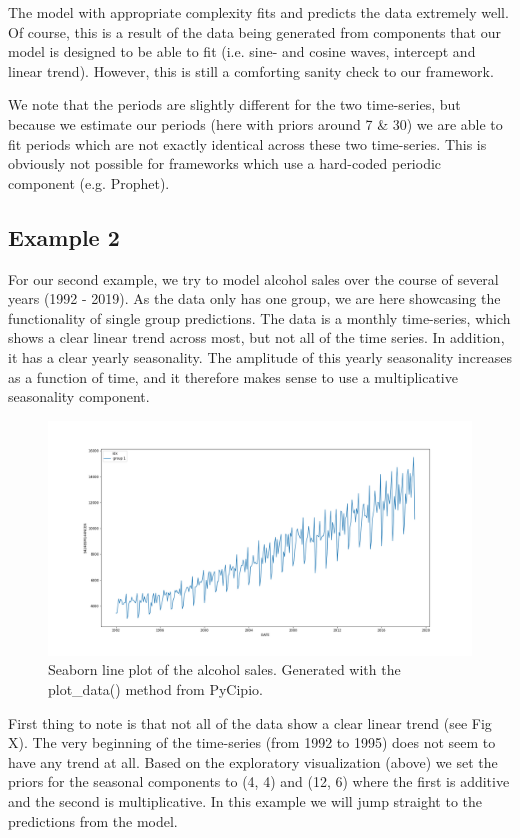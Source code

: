 \documentclass{article}
\begin{document}
The model with appropriate complexity fits and predicts the data extremely well. Of course, this is a result of the data being generated from components that our model is designed to be able to fit (i.e. sine- and cosine waves, intercept and linear trend). However, this is still a comforting sanity check to our framework.

We note that the periods are slightly different for the two time-series, but because we estimate our periods (here with priors around 7 \& 30) we are able to fit periods which are not exactly identical across these two time-series. This is obviously not possible for frameworks which use a hard-coded periodic component (e.g. Prophet). 

\subsection{Example 2}

For our second example, we try to model alcohol sales over the course of several years (1992 - 2019). As the data only has one group, we are here showcasing the functionality of single group predictions. The data is a monthly time-series, which shows a clear linear trend across most, but not all of the time series. In addition, it has a clear yearly seasonality. The amplitude of this yearly seasonality increases as a function of time, and it therefore makes sense to use a multiplicative seasonality component.

\begin{figure}[H]
    \centerline{\includegraphics[scale = 0.45]{../plots/ex2_plot_data.png}}
    \caption{Seaborn line plot of the alcohol sales. Generated with the plot\_data() method from PyCipio. }
\end{figure}

First thing to note is that not all of the data show a clear linear trend (see Fig X). The very beginning of the time-series (from 1992 to 1995) does not seem to have any trend at all. Based on the exploratory visualization (above) we set the priors for the seasonal components to (4, 4) and (12, 6) where the first is additive and the second is multiplicative. In this example we will jump straight to the predictions from the model. 
\end{document}
